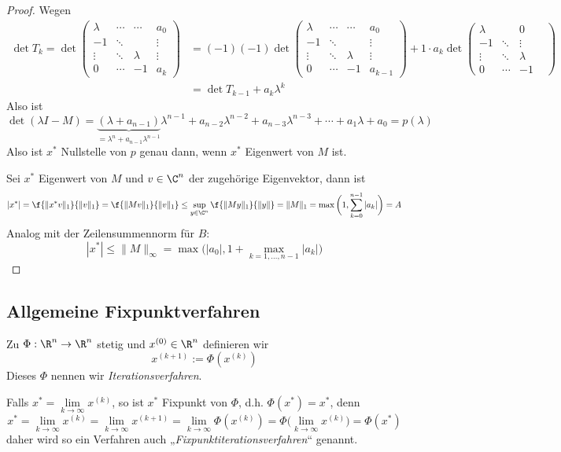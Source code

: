 \documentclass[11pt]{scrartcl}
\begin{document}
\begin{st}
\begin{proof}
		Wegen
		\begin{align*}
			\det T_k = \det \begin{pmatrix}
				\lambda & \cdots & \cdots & a_0 \\
				-1 & \ddots &  &\vdots \\
				\vdots & \ddots & \lambda &\vdots \\
				0 & \cdots & -1 & a_k 
			\end{pmatrix}
			&= (-1)(-1) 
			\det \begin{pmatrix}
				\lambda & \cdots & \cdots & a_0 \\
				-1 & \ddots &  &\vdots \\
				\vdots & \ddots & \lambda &\vdots \\
				0 & \cdots & -1 & a_{k-1} 
			\end{pmatrix}
			+ 1 \cdot a_k 
			\det \begin{pmatrix}
				\lambda & &  0 \\
				-1 & \ddots &  \vdots \\
				\vdots & \ddots & \lambda  \\
				0 & \cdots & -1 & 
			\end{pmatrix} \\
			&= \det T_{k-1} + a_k \lambda^k
		\end{align*}
		Also ist
		\[
			\det(\lambda I-M) = \underbrace{(\lambda +a_{n-1})}_{=\lambda^n + a_{n-1}\lambda^{n-1}} \lambda^{n-1} + a_{n-2} \lambda^{n-2} + a_{n-3}\lambda^{n-3} + \dotsb + a_1 \lambda + a_0 = p(\lambda)
		\]
		Also ist $x^*$ Nullstelle von $p$ genau dann, wenn $x^*$ Eigenwert von $M$ ist.

		Sei $x^*$ Eigenwert von $M$ und $v\in \C^n$ der zugehörige Eigenvektor, dann ist
		\[
			|x^*| 
			= \f {\|x^*v\|_1}{\|v\|_1} 
			= \f {\|Mv\|_1}{\|v\|_1}
			\le \sup_{y\in\C^n} \f {\|My\|_1}{\|y\|}
			= \|M\|_1
			= \max\bigg(1, \sum_{k=0}^{n-1} |a_k| \bigg)
			= A
		\]
		Analog mit der Zeilensummennorm für $B$:
		\[
			|x^*| \le \|M\|_\infty = \max\Big( |a_0|, 1 + \max_{k=1,\dotsc,n-1} |a_k| \Big)
		\]
	\end{proof}
\end{st}

\subsection{Allgemeine Fixpunktverfahren}

\begin{df}[Iterationsverfahren] \label{3.10}
	Zu $\Phi: \R^n \to \R^n$ stetig und $x^{(0)} \in \R^n$ definieren wir
	\[
		x^{(k+1)} := \Phi(x^{(k)})
	\]
	Dieses $\Phi$ nennen wir \emph{Iterationsverfahren}.
	\begin{note}
		Falls $x^* = \lim\limits_{k\to \infty} x^{(k)}$, so ist $x^*$ Fixpunkt von $\Phi$, d.h. $\Phi(x^*) = x^*$, denn
		\[
			x^* = \lim_{k\to \infty} x^{(k)} = \lim_{k\to \infty} x^{(k+1)} = \lim_{k\to \infty} \Phi(x^{(k)}) = \Phi\Big(\lim_{k\to \infty} x^{(k)}\Big) = \Phi(x^*)
		\]
		daher wird so ein Verfahren auch „\emph{Fixpunktiterationsverfahren}“ genannt.
	\end{note}
\end{df}
\end{document}
